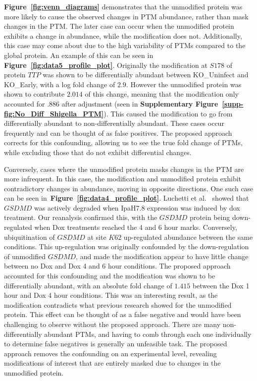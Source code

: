 \documentclass[mcp]{article}
\numberwithin{table}{section}
\def\figref#1{{\bf Figure~\ref{fig:#1}}}
\begin{document}
\figref{venn_diagrams} demonstrates that the unmodified protein was more likely to cause the observed changes in PTM abundance, rather than mask changes in the PTM. The later case can occur when the unmodified protein exhibits a change in abundance, while the modification does not. Additionally, this case may come about due to the high variability of PTMs compared to the global protein. An example of this can be seen in \figref{data5_profile_plot}. Originally the modification at $S178$ of protein $TTP$ was shown to be differentially abundant between KO\_Uninfect and KO\_Early, with a log fold change of $2.9$. However the unmodified protein was shown to contribute $2.014$ of this change, meaning that the modification only accounted for $.886$ after adjustment (seen in {\bf Supplementary Figure~\ref{supp-fig:No_Diff_Shigella_PTM}}). This caused the modification to go from differentially abundant to non-differentially abundant. These cases occur frequently and can be thought of as false positives. The proposed approach corrects for this confounding, allowing us to see the true fold change of PTMs, while excluding those that do not exhibit differential changes.

Conversely, cases where the unmodified protein masks changes in the PTM are more infrequent. In this case, the modification and unmodified protein exhibit contradictory changes in abundance, moving in opposite directions. One such case can be seen in~\figref{data4_profile_plot}. Luchetti et al.~\cite{LUCHETTI2021} showed that $GSDMD$ was actively degraded when IpaH7.8 expression was induced by dox treatment. Our reanalysis confirmed this, with the $GSDMD$ protein being down-regulated when Dox treatments reached the 4 and 6 hour marks. Conversely, ubiquitination of $GSDMD$ at site $K62$ up-regulated abundance between the same conditions. This up-regulation was originally confounded by the down-regulation of unmodified $GSDMD$, and made the modification appear to have little change between no Dox and Dox 4 and 6 hour conditions. The proposed approach accounted for this confounding and the modification was shown to be differentially abundant, with an absolute fold change of $1.415$ between the Dox 1 hour and Dox 4 hour conditions. This was an interesting result, as the modification contradicts what previous research showed for the unmodified protein. This effect can be thought of as a false negative and would have been challenging to observe without the proposed approach. There are many non-differentially abundant PTMs, and having to comb through each one individually to determine false negatives is generally an unfeasible task. The proposed approach removes the confounding on an experimental level, revealing modifications of interest that are entirely masked due to changes in the unmodified protein.
\end{document}
